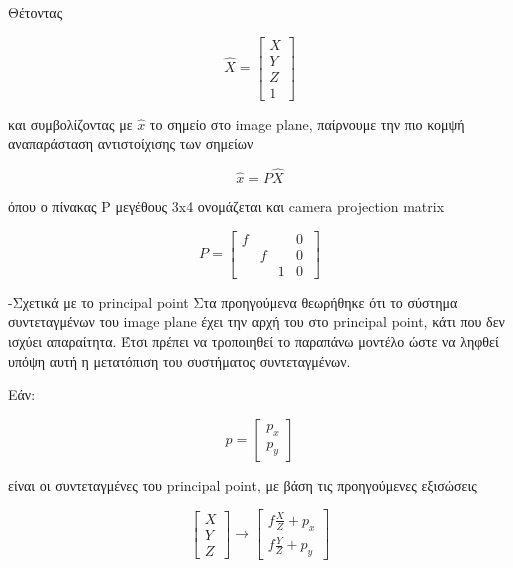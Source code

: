 Θέτοντας 

\begin{equation}
\hat{X}=
\begin{bmatrix}
X\\ 
Y\\
Z\\
1
\end{bmatrix}
\end{equation}

και συμβολίζοντας με $\hat{x}$ το σημείο στο image plane, παίρνουμε την πιο κομψή αναπαράσταση αντιστοίχισης των σημείων

\begin{equation}
\hat{x}=P\hat{X}
\end{equation}

όπου ο πίνακας P μεγέθους 3x4 ονομάζεται και camera projection matrix

\begin{equation}
P=
\begin{bmatrix}
f & & & 0 \\
 & f &  & 0\\
 & & 1 & 0\
\end{bmatrix}
\end{equation}


-Σχετικά με το principal point
Στα προηγούμενα θεωρήθηκε ότι το σύστημα συντεταγμένων του image plane έχει την αρχή του στο principal point, κάτι που δεν ισχύει απαραίτητα. Έτσι πρέπει να τροποιηθεί το παραπάνω μοντέλο ώστε να ληφθεί υπόψη αυτή η μετατόπιση του συστήματος συντεταγμένων.

Εάν:

\begin{equation}
p=
\begin{bmatrix}
p_{x}\\
p_{y}
\end{bmatrix}
\end{equation}

είναι οι συντεταγμένες του principal point, με βάση τις προηγούμενες εξισώσεις

\begin{equation}
\begin{bmatrix}
X\\ 
Y\\
Z
\end{bmatrix}
\rightarrow
\begin{bmatrix}
f\frac{X}{Z}+p_{x}\\
f\frac{Y}{Z}+p_{y}
\end{bmatrix}
\end{equation}

